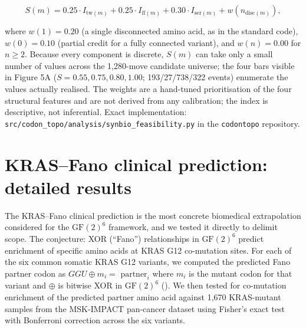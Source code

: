 \documentclass[preprint,11pt,authoryear,a4paper]{elsarticle}
\begin{document}
\[S(m) = 0.25 \cdot I_{\text{tw}(m)} + 0.25 \cdot I_{\text{ff}(m)} + 0.30 \cdot I_{\text{ser}(m)} + w\left( n_{\text{disc}(m)} \right),\]

where \(w(1) = 0.20\) (a single disconnected amino acid, as in the
standard code), \(w(0) = 0.10\) (partial credit for a fully connected
variant), and \(w(n) = 0.00\) for \(n \geq 2\). Because every component
is discrete, \(S(m)\) can take only a small number of values across the
1,280-move candidate universe; the four bars visible in Figure 5A
(\(S = 0.55,0.75,0.80,1.00\); 193/27/738/322 events) enumerate the
values actually realised. The weights are a hand-tuned prioritisation of
the four structural features and are not derived from any calibration;
the index is descriptive, not inferential. Exact implementation:
\texttt{src/codon\_topo/analysis/synbio\_feasibility.py} in the
\texttt{codontopo} repository.

\section{KRAS--Fano clinical prediction: detailed
results}\label{sec:s-kras}

The KRAS--Fano clinical prediction is the most concrete biomedical
extrapolation considered for the \({\text{GF}(2)}^{6}\) framework, and
we tested it directly to delimit scope. The conjecture: XOR (``Fano'')
relationships in \({\text{GF}(2)}^{6}\) predict enrichment of specific
amino acids at KRAS G12 co-mutation sites. For each of the six common
somatic KRAS G12 variants, we computed the predicted Fano partner codon
as \(GGU \oplus m_{i} = \text{ partner}_{i}\) where \(m_{i}\) is the
mutant codon for that variant and \(\oplus\) is bitwise XOR in
\({\text{GF}(2)}^{6}\) (). We then tested for
co-mutation enrichment of the predicted partner amino acid against 1,670
KRAS-mutant samples from the MSK-IMPACT pan-cancer dataset
\citep{zehir2017} using Fisher's exact test with Bonferroni correction
across the six variants.
\end{document}
